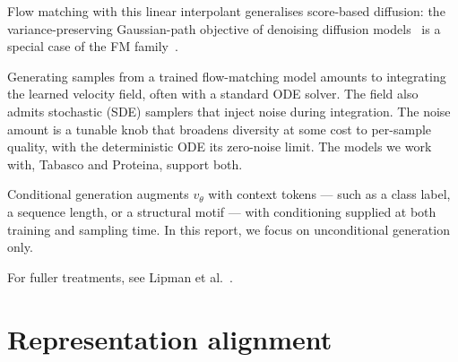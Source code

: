 \documentclass[12pt,a4paper,twoside]{report}
\begin{document}
Flow matching with this linear interpolant generalises score-based diffusion: the variance-preserving Gaussian-path objective of denoising diffusion models~\cite{DDPM} is a special case of the FM family~\cite{FlowMatching,FMGuide}.

Generating samples from a trained flow-matching model amounts to integrating the learned velocity field, often with a standard ODE solver. The field also admits stochastic (SDE) samplers that inject noise during integration. The noise amount is a tunable knob that broadens diversity at some cost to per-sample quality, with the deterministic ODE its zero-noise limit. The models we work with, Tabasco and Proteina, support both.

Conditional generation augments $v_\theta$ with context tokens --- such as a class label, a sequence length, or a structural motif --- with conditioning supplied at both training and sampling time. In this report, we focus on unconditional generation only.

For fuller treatments, see Lipman et al.~\cite{FlowMatching,FMGuide}.


\section{Representation alignment}
\label{sec:repa}
\end{document}
